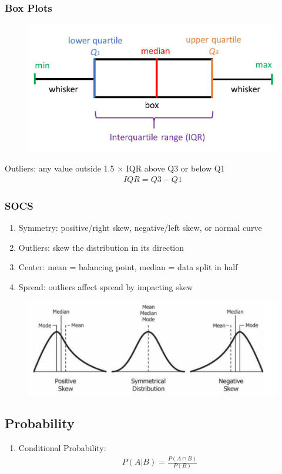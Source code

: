 \documentclass[12pt]{article}
\numberwithin{equation}{section}
\begin{document}
\subsubsection{Box Plots}
\begin{figure}[!ht]
    \centering
    \includegraphics[width=0.8\linewidth]{figures/boxplot.jpg}
\end{figure}
Outliers: any value outside 1.5 $\times$ IQR above Q3 or below Q1
\begin{align}
    IQR = Q3 - Q1
\end{align}

\subsubsection{SOCS}
\begin{enumerate}
    \item Symmetry: positive/right skew, negative/left skew, or normal curve
    \item Outliers: skew the distribution in its direction
    \item Center: mean = balancing point, median = data split in half
    \item Spread: outliers affect spread by impacting skew
\end{enumerate}
\begin{figure}[!ht]
    \centering
    \includegraphics[width=0.9\linewidth]{figures/skew.png}
\end{figure}

\subsection{Probability}
\begin{enumerate}
    \item Conditional Probability:
    \begin{align}
        P(A|B) = \frac{P(A \cap B)}{P(B)}
    \end{align}
\end{enumerate}
\end{document}
